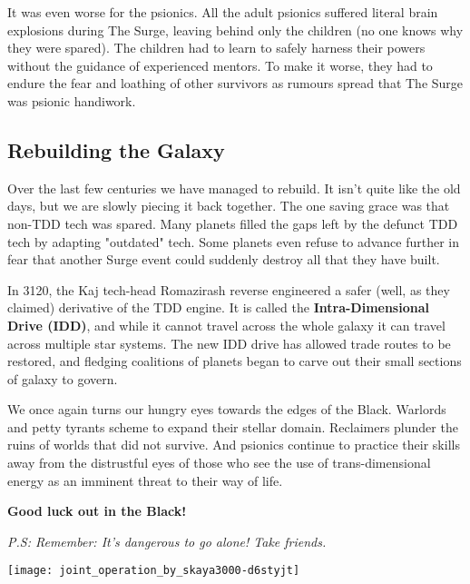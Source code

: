 \begin{multicols}{2}
  It was even worse for the psionics. All the adult psionics suffered literal brain explosions during The Surge, leaving behind only the children (no one knows why they were spared). The children had to learn to safely harness their powers without the guidance of experienced mentors. To make it worse, they had to endure the fear and loathing of other survivors as rumours spread that The Surge was psionic handiwork.
  
  \subsection{Rebuilding the Galaxy}

  Over the last few centuries we have managed to rebuild. It isn't quite like the old days, but we are slowly piecing it back together. The one saving grace was that non-TDD tech was spared. Many planets filled the gaps left by the defunct TDD tech by adapting "outdated" tech. Some planets even refuse to advance further in fear that another Surge event could suddenly destroy all that they have built.
  
  In 3120, the Kaj tech-head Romazirash reverse engineered a safer (well, as they claimed) derivative of the TDD engine. It is called the \textbf{Intra-Dimensional Drive (IDD)}, and while it cannot travel across the whole galaxy it can travel across multiple star systems. The new IDD drive has allowed trade routes to be restored, and fledging coalitions of planets began to carve out their small sections of galaxy to govern. 
  
  We once again turns our hungry eyes towards the edges of the Black. Warlords and petty tyrants scheme to expand their stellar domain. Reclaimers plunder the ruins of worlds that did not survive. And psionics continue to practice their skills away from the distrustful eyes of those who see the use of trans-dimensional energy as an imminent threat to their way of life.

  \textbf{Good luck out in the Black!}
  
  \textit{P.S: Remember: It's dangerous to go alone! Take friends.}
\end{multicols}

\vspace{\baselineskip}

\texttt{[image: joint\_operation\_by\_skaya3000-d6styjt]}
